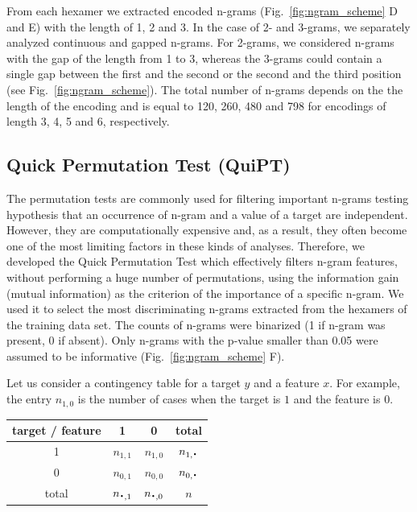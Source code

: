 \documentclass[fleqn,10pt,twoside]{gcb15submission}
\newcommand*{\bigcdot}{\raisebox{-0.25ex}{\scalebox{1.5}{$\cdot$}}}
\begin{document}
  From each hexamer we extracted encoded n-grams (Fig.~\ref{fig:ngram_scheme} D 
and E) with the length of 1, 2 and 3. In the case of 2- and 3-grams, we 
separately analyzed continuous and gapped n-grams. For 2-grams, we considered 
n-grams with the gap of the length from 1 to 3, whereas the 3-grams could 
contain a single gap between the first and the second or the second and the 
third position (see Fig.~\ref{fig:ngram_scheme}). The total number of n-grams 
depends on the the length of the encoding and is equal to 120, 260, 480 and 798 
for encodings of length 3, 4, 5 and 6, respectively.


\subsection{Quick Permutation Test (QuiPT)}

  The permutation tests are commonly used for filtering important n-grams 
testing hypothesis that an occurrence of n-gram and a value of a target are 
independent. However, they are computationally expensive and, as a result, they 
often become one of the most limiting factors in these kinds of analyses. 
Therefore, we developed the Quick Permutation Test which effectively filters 
n-gram features, without performing a huge number of permutations, using the 
information gain (mutual information) as the criterion of the importance of a 
specific n-gram. We used it to select the most discriminating n-grams extracted 
from the hexamers of the training data set. The counts of n-grams were binarized 
(1 if n-gram was present, 0 if absent). Only n-grams with the p-value smaller 
than 0.05 were assumed to be informative (Fig.~\ref{fig:ngram_scheme} F). 

Let us consider a contingency table for a target $y$ and 
a feature $x$. For example, the entry $n_{1,0}$ is the number of cases when the 
target is $1$ and the feature is $0$.

\begin{center}
\begin{tabular}{ | c || c | c | c | }
%
%
  \hline			
  target / feature & 1 & 0 & total\\ \hline
 1 & $n_{1,1}$ & $n_{1,0}$ & $n_{1,\bigcdot}$ \\
 0 & $n_{0,1}$ & $n_{0,0}$ & $n_{0,\bigcdot}$ \\ \hline
 total & $n_{\bigcdot,1}$ & $n_{\bigcdot,0}$ & $n$ \\
  \hline  
\end{tabular} 
\end{center}
\end{document}
